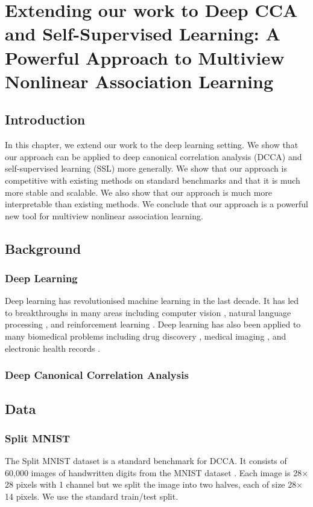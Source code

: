\chapter{Extending our work to Deep CCA and Self-Supervised Learning: A Powerful Approach to Multiview Nonlinear Association Learning}

\section{Introduction}
In this chapter, we extend our work to the deep learning setting. We show that our approach can be applied to deep canonical correlation analysis (DCCA) and self-supervised learning (SSL) more generally. We show that our approach is competitive with existing methods on standard benchmarks and that it is much more stable and scalable. We also show that our approach is much more interpretable than existing methods. We conclude that our approach is a powerful new tool for multiview nonlinear association learning.

\section{Background}
\subsection{Deep Learning}
Deep learning has revolutionised machine learning in the last decade. It has led to breakthroughs in many areas including computer vision \cite{krizhevsky2012imagenet}, natural language processing \cite{devlin2018bert}, and reinforcement learning \cite{mnih2015human}. Deep learning has also been applied to many biomedical problems including drug discovery \cite{gawehn2016deep}, medical imaging \cite{litjens2017survey}, and electronic health records \cite{rajkomar2018scalable}.

\subsection{Deep Canonical Correlation Analysis}


\section{Data}

\subsection{Split MNIST}
The Split MNIST dataset \cite{wang2015stochastic} is a standard benchmark for DCCA. It consists of 60,000 images of handwritten digits from the MNIST dataset \cite{lecun1998gradient}. Each image is 28$\times$28 pixels with 1 channel but we split the image into two halves, each of size 28$\times$14 pixels. We use the standard train/test split.

